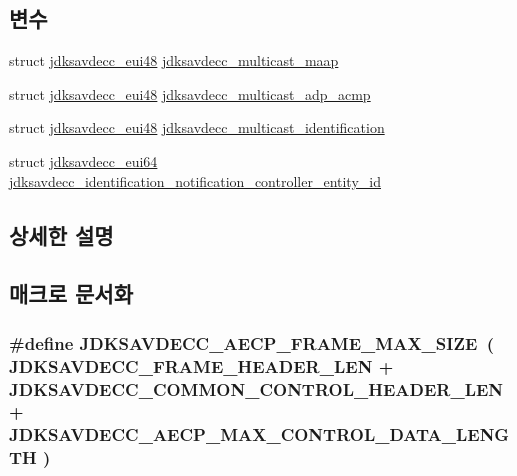 \subsection*{변수}
\begin{DoxyCompactItemize}
\item 
struct \hyperlink{structjdksavdecc__eui48}{jdksavdecc\+\_\+eui48} \hyperlink{group__pdu_ga7e563753b3274a7c70f32d5698e11c28}{jdksavdecc\+\_\+multicast\+\_\+maap}
\item 
struct \hyperlink{structjdksavdecc__eui48}{jdksavdecc\+\_\+eui48} \hyperlink{group__pdu_ga151652dc8a9ab46279afe5930fe815d5}{jdksavdecc\+\_\+multicast\+\_\+adp\+\_\+acmp}
\item 
struct \hyperlink{structjdksavdecc__eui48}{jdksavdecc\+\_\+eui48} \hyperlink{group__pdu_ga43136b2dc4b8d4d37572d335a27503f3}{jdksavdecc\+\_\+multicast\+\_\+identification}
\item 
struct \hyperlink{structjdksavdecc__eui64}{jdksavdecc\+\_\+eui64} \hyperlink{group__pdu_gad850df91f1465281853a40125c5aa663}{jdksavdecc\+\_\+identification\+\_\+notification\+\_\+controller\+\_\+entity\+\_\+id}
\end{DoxyCompactItemize}


\subsection{상세한 설명}


\subsection{매크로 문서화}
\subsubsection[{\texorpdfstring{J\+D\+K\+S\+A\+V\+D\+E\+C\+C\+\_\+\+A\+E\+C\+P\+\_\+\+F\+R\+A\+M\+E\+\_\+\+M\+A\+X\+\_\+\+S\+I\+ZE}{JDKSAVDECC_AECP_FRAME_MAX_SIZE}}]{\setlength{\rightskip}{0pt plus 5cm}\#define J\+D\+K\+S\+A\+V\+D\+E\+C\+C\+\_\+\+A\+E\+C\+P\+\_\+\+F\+R\+A\+M\+E\+\_\+\+M\+A\+X\+\_\+\+S\+I\+ZE~( {\bf J\+D\+K\+S\+A\+V\+D\+E\+C\+C\+\_\+\+F\+R\+A\+M\+E\+\_\+\+H\+E\+A\+D\+E\+R\+\_\+\+L\+EN} + {\bf J\+D\+K\+S\+A\+V\+D\+E\+C\+C\+\_\+\+C\+O\+M\+M\+O\+N\+\_\+\+C\+O\+N\+T\+R\+O\+L\+\_\+\+H\+E\+A\+D\+E\+R\+\_\+\+L\+EN} + {\bf J\+D\+K\+S\+A\+V\+D\+E\+C\+C\+\_\+\+A\+E\+C\+P\+\_\+\+M\+A\+X\+\_\+\+C\+O\+N\+T\+R\+O\+L\+\_\+\+D\+A\+T\+A\+\_\+\+L\+E\+N\+G\+TH} )}\hypertarget{group__pdu_ga504d7a51b28c5f53b3769ec6dfe1bbca}{}\label{group__pdu_ga504d7a51b28c5f53b3769ec6dfe1bbca}


